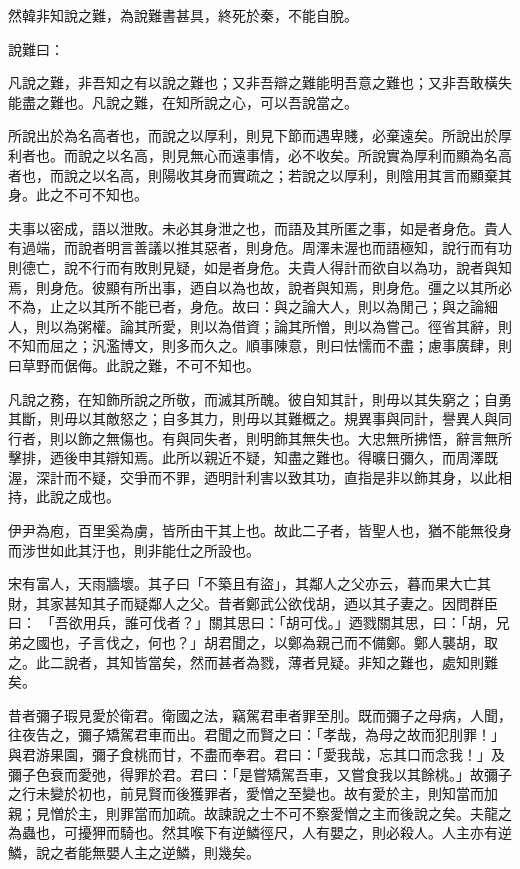 \begin{pinyinscope}
然韓非知說之難，為說難書甚具，終死於秦，不能自脫。

說難曰：

凡說之難，非吾知之有以說之難也；又非吾辯之難能明吾意之難也；又非吾敢橫失能盡之難也。凡說之難，在知所說之心，可以吾說當之。

所說出於為名高者也，而說之以厚利，則見下節而遇卑賤，必棄遠矣。所說出於厚利者也。而說之以名高，則見無心而遠事情，必不收矣。所說實為厚利而顯為名高者也，而說之以名高，則陽收其身而實疏之；若說之以厚利，則陰用其言而顯棄其身。此之不可不知也。

夫事以密成，語以泄敗。未必其身泄之也，而語及其所匿之事，如是者身危。貴人有過端，而說者明言善議以推其惡者，則身危。周澤未渥也而語極知，說行而有功則德亡，說不行而有敗則見疑，如是者身危。夫貴人得計而欲自以為功，說者與知焉，則身危。彼顯有所出事，迺自以為也故，說者與知焉，則身危。彊之以其所必不為，止之以其所不能已者，身危。故曰：與之論大人，則以為閒己；與之論細人，則以為粥權。論其所愛，則以為借資；論其所憎，則以為嘗己。徑省其辭，則不知而屈之；汎濫博文，則多而久之。順事陳意，則曰怯懦而不盡；慮事廣肆，則曰草野而倨侮。此說之難，不可不知也。

凡說之務，在知飾所說之所敬，而滅其所醜。彼自知其計，則毋以其失窮之；自勇其斷，則毋以其敵怒之；自多其力，則毋以其難概之。規異事與同計，譽異人與同行者，則以飾之無傷也。有與同失者，則明飾其無失也。大忠無所拂悟，辭言無所擊排，迺後申其辯知焉。此所以親近不疑，知盡之難也。得曠日彌久，而周澤既渥，深計而不疑，交爭而不罪，迺明計利害以致其功，直指是非以飾其身，以此相持，此說之成也。

伊尹為庖，百里奚為虜，皆所由干其上也。故此二子者，皆聖人也，猶不能無役身而涉世如此其汙也，則非能仕之所設也。

宋有富人，天雨牆壞。其子曰「不築且有盜」，其鄰人之父亦云，暮而果大亡其財，其家甚知其子而疑鄰人之父。昔者鄭武公欲伐胡，迺以其子妻之。因問群臣曰： 「吾欲用兵，誰可伐者？」關其思曰：「胡可伐。」迺戮關其思，曰：「胡，兄弟之國也，子言伐之，何也？」胡君聞之，以鄭為親己而不備鄭。鄭人襲胡，取之。此二說者，其知皆當矣，然而甚者為戮，薄者見疑。非知之難也，處知則難矣。

昔者彌子瑕見愛於衛君。衛國之法，竊駕君車者罪至刖。既而彌子之母病，人聞，往夜告之，彌子矯駕君車而出。君聞之而賢之曰：「孝哉，為母之故而犯刖罪！」與君游果園，彌子食桃而甘，不盡而奉君。君曰：「愛我哉，忘其口而念我！」及彌子色衰而愛弛，得罪於君。君曰：「是嘗矯駕吾車，又嘗食我以其餘桃。」故彌子之行未變於初也，前見賢而後獲罪者，愛憎之至變也。故有愛於主，則知當而加親；見憎於主，則罪當而加疏。故諫說之士不可不察愛憎之主而後說之矣。夫龍之為蟲也，可擾狎而騎也。然其喉下有逆鱗徑尺，人有嬰之，則必殺人。人主亦有逆鱗，說之者能無嬰人主之逆鱗，則幾矣。


\end{pinyinscope}
